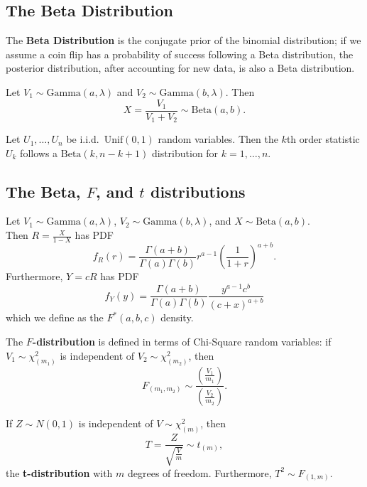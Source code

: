 \begin{enumerate}[a)]
    \subsection{The Beta Distribution}

    \begin{definition}
    The \textbf{Beta Distribution} is the conjugate prior of the binomial distribution; if we assume a coin flip has a probability of success following a
    Beta distribution, the posterior distribution, after accounting for new data, is also a Beta distribution.
    \end{definition}

    \begin{remark}
    Let $V_1 \sim \mathrm{Gamma}(a, \lambda)$ and $V_2 \sim \mathrm{Gamma}(b, \lambda)$. Then
    \[
        X = \frac{V_1}{V_1 + V_2} \sim \mathrm{Beta}(a, b). 
    \]
    \end{remark}

    \begin{remark}
    Let $U_1, \dots, U_n$ be i.i.d.\ $\mathrm{Unif}(0, 1)$ random variables. Then the $k$th order statistic $U_k$ follows a $\mathrm{Beta}(k, n-k + 1)$ distribution for $k = 1, \dots , n$.   
    \end{remark}

    \subsection{The Beta, $F$, and $t$ distributions}
    \begin{remark}
    Let $V_1 \sim \mathrm{Gamma}(a, \lambda)$, $V_2 \sim \mathrm{Gamma}(b, \lambda)$, and $X \sim \mathrm{Beta}(a, b)$. \\
    
    Then $R = \frac{X}{1-X}$ has PDF
    \[
        f_R(r) = \frac{\Gamma(a + b)}{\Gamma(a)\Gamma(b)} r^{a-1} \left( \frac{1}{1+r} \right)^{a+b}.  
    \]
    Furthermore, $Y = cR$ has PDF
    \[
        f_Y(y) = \frac{\Gamma(a + b)}{\Gamma(a)\Gamma(b)} \frac{y^{a-1} c^b}{(c+x)^{a+b}} 
    \]
    which we define as the $F^* (a, b, c)$ density.
    
    \end{remark}

    \begin{definition}[F-distribution]
    The \textbf{$F$-distribution} is defined in terms of Chi-Square random variables: if $V_1 \sim \chi_(m_1)^2$ is independent of  $V_2 \sim \chi_(m_2)^2$, then
    \[
        F_{(m_1, m_2)} \sim \frac{\left( \frac{V_1}{m_1} \right) }{\left( \frac{V_2}{m_2} \right)}.
    \]
    \end{definition}

    \begin{definition}
    If $Z \sim N(0, 1)$ is independent of $V \sim \chi_{(m)}^2$, then 
    \[
        T = \frac{Z}{\sqrt{\frac{V}{m}} } \sim t_(m),
    \]
    the \textbf{t-distribution} with $m$ degrees of freedom. Furthermore, $T^2 \sim F_{(1, m)}$. 
    \end{definition}

\end{enumerate}
